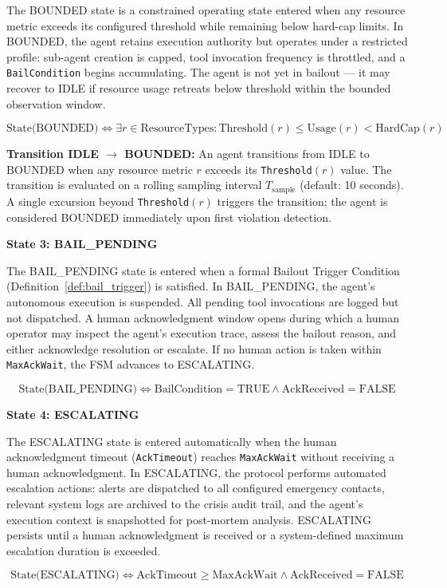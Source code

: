 \begin{definition}\label{def:bounded}
The BOUNDED state is a constrained operating state entered when any resource metric exceeds its configured threshold while remaining below hard-cap limits. In BOUNDED, the agent retains execution authority but operates under a restricted profile: sub-agent creation is capped, tool invocation frequency is throttled, and a \texttt{BailCondition} begins accumulating. The agent is not yet in bailout — it may recover to IDLE if resource usage retreats below threshold within the bounded observation window.

\[
\text{State(BOUNDED)} \iff \exists r \in \text{ResourceTypes}: \text{Threshold}(r) \leq \text{Usage}(r) < \text{HardCap}(r)
\]

\bigskip
\noindent\textbf{Transition IDLE $\rightarrow$ BOUNDED:} An agent transitions from IDLE to BOUNDED when any resource metric $r$ exceeds its \texttt{Threshold}$(r)$ value. The transition is evaluated on a rolling sampling interval $T_{\text{sample}}$ (default: 10 seconds). A single excursion beyond \texttt{Threshold}$(r)$ triggers the transition; the agent is considered BOUNDED immediately upon first violation detection.
\end{definition}

\bigskip
\noindent\textbf{State 3: BAIL\_PENDING}

\begin{definition}\label{def:bail_pending}
The BAIL\_PENDING state is entered when a formal Bailout Trigger Condition (Definition~\ref{def:bail_trigger}) is satisfied. In BAIL\_PENDING, the agent's autonomous execution is suspended. All pending tool invocations are logged but not dispatched. A human acknowledgment window opens during which a human operator may inspect the agent's execution trace, assess the bailout reason, and either acknowledge resolution or escalate. If no human action is taken within \texttt{MaxAckWait}, the FSM advances to ESCALATING.

\[
\text{State(BAIL\_PENDING)} \iff \text{BailCondition} = \text{TRUE} \land \text{AckReceived} = \text{FALSE}
\]
\end{definition}

\bigskip
\noindent\textbf{State 4: ESCALATING}

\begin{definition}\label{def:escalating}
The ESCALATING state is entered automatically when the human acknowledgment timeout (\texttt{AckTimeout}) reaches \texttt{MaxAckWait} without receiving a human acknowledgment. In ESCALATING, the protocol performs automated escalation actions: alerts are dispatched to all configured emergency contacts, relevant system logs are archived to the crisis audit trail, and the agent's execution context is snapshotted for post-mortem analysis. ESCALATING persists until a human acknowledgment is received or a system-defined maximum escalation duration is exceeded.

\[
\text{State(ESCALATING)} \iff \text{AckTimeout} \geq \text{MaxAckWait} \land \text{AckReceived} = \text{FALSE}
\]
\end{definition}

